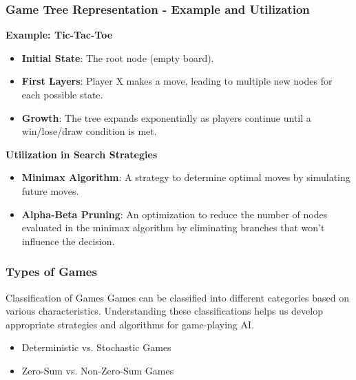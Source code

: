 \documentclass[aspectratio=169]{beamer}
\begin{document}
\begin{frame}[fragile]
  \frametitle{Game Tree Representation - Example and Utilization}
  \textbf{Example: Tic-Tac-Toe}
  \begin{itemize}
    \item \textbf{Initial State}: The root node (empty board).
    \item \textbf{First Layers}: Player X makes a move, leading to multiple new nodes for each possible state.
    \item \textbf{Growth}: The tree expands exponentially as players continue until a win/lose/draw condition is met.
  \end{itemize}
  
  \textbf{Utilization in Search Strategies}
  \begin{itemize}
    \item \textbf{Minimax Algorithm}: A strategy to determine optimal moves by simulating future moves.
    \item \textbf{Alpha-Beta Pruning}: An optimization to reduce the number of nodes evaluated in the minimax algorithm by eliminating branches that won’t influence the decision.
  \end{itemize}
\end{frame}

\begin{frame}[fragile]
    \frametitle{Types of Games}
    \begin{block}{Classification of Games}
        Games can be classified into different categories based on various characteristics. Understanding these classifications helps us develop appropriate strategies and algorithms for game-playing AI. 
    \end{block}
    \begin{itemize}
        \item Deterministic vs. Stochastic Games
        \item Zero-Sum vs. Non-Zero-Sum Games
    \end{itemize}
\end{frame}
\end{document}

